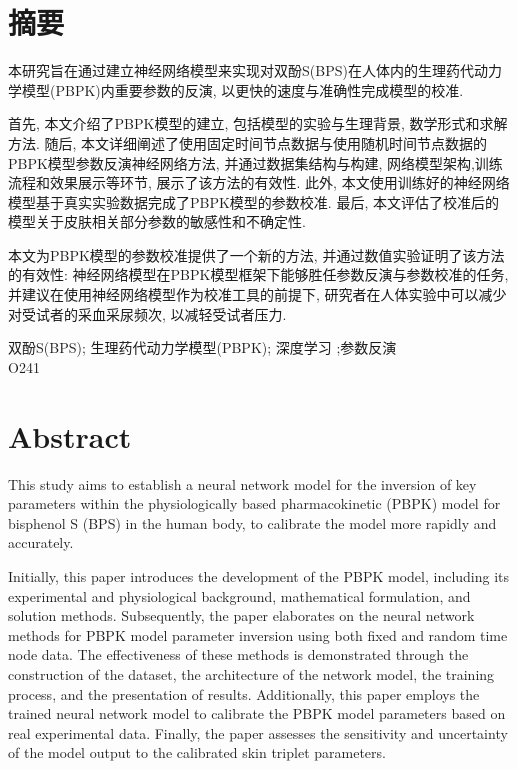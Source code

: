 \documentclass[a4paper,punct=banjiao,twoside]{ctexrep}
\theoremstyle{plain}
\theoremstyle{definition}
\theoremstyle{remark}
\begin{document}
\renewcommand{\thepage}{\roman{page}}

\renewcommand{\contentsname}{目\quad 录}
\tableofcontents
\setcounter{page}{1}

\chapter*{摘\quad 要}
\normalsize

本研究旨在通过建立神经网络模型来实现对双酚S(BPS)在人体内的生理药代动力学模型(PBPK)内重要参数的反演, 以更快的速度与准确性完成模型的校准. 

首先, 本文介绍了PBPK模型的建立, 包括模型的实验与生理背景, 数学形式和求解方法. 随后, 本文详细阐述了使用固定时间节点数据与使用随机时间节点数据的PBPK模型参数反演神经网络方法, 并通过数据集结构与构建,
网络模型架构,训练流程和效果展示等环节, 展示了该方法的有效性. 此外, 本文使用训练好的神经网络模型基于真实实验数据完成了PBPK模型的参数校准. 最后, 本文评估了校准后的模型关于皮肤相关部分参数的敏感性和不确定性.

本文为PBPK模型的参数校准提供了一个新的方法, 并通过数值实验证明了该方法的有效性: 神经网络模型在PBPK模型框架下能够胜任参数反演与参数校准的任务, 并建议在使用神经网络模型作为校准工具的前提下, 研究者在人体实验中可以减少对受试者的采血采尿频次, 以减轻受试者压力. 



 双酚S(BPS); 生理药代动力学模型(PBPK);  深度学习 ;参数反演\\
 O241


\chapter*{Abstract}
\normalsize

\iffalse
This study aims to establish a neural network model for the inversion of key parameters within the physiologically based pharmacokinetic (PBPK) model for bisphenol S (BPS) in the human body, to calibrate the model more rapidly and accurately.

Initially, this paper introduces the development of the PBPK model, including its experimental and physiological background, mathematical formulation, and solution methods. Subsequently, the paper elaborates on the neural network methods for PBPK model parameter inversion using both fixed and random time node data. The effectiveness of these methods is demonstrated through the construction of the dataset, the architecture of the network model, the training process, and the presentation of results. Additionally, this paper employs the trained neural network model to calibrate the PBPK model parameters based on real experimental data. Finally, the paper assesses the sensitivity and uncertainty of the model output  to the calibrated skin triplet parameters.
\end{document}
